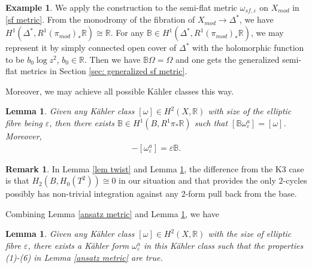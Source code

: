 \documentclass[11pt]{amsart}
\theoremstyle{plain}
\newtheorem{lem}[thm]{Lemma}
\theoremstyle{definition}
\newtheorem{ex}[thm]{Example}
\newtheorem{rk}[thm]{Remark}
\numberwithin{equation}{section}
\renewcommand{\epsilon}{\varepsilon}
\begin{document}
\begin{ex}
	We apply the construction to the semi-flat metric $\omega_{sf,\epsilon}$ on $X_{mod}$ in \eqref{sf metric}. From the monodromy of the fibration of $X_{mod}\rightarrow \Delta^*$, we have $H^1(\Delta^*,R^1(\pi_{mod})_*\mathbb{R})\cong \mathbb{R}$. 
	For any $\mathbb{B}\in H^1(\Delta^*,R^1(\pi_{mod})_*\mathbb{R})$, we may represent it by simply connected open cover of $\Delta^*$ with the holomorphic function to be $b_0\log{z}^2$, $b_0\in \mathbb{R}$. Then we have $\mathbb{B}\Omega=\Omega$ and one gets the generalized semi-flat metrics in Section \ref{sec: generalized sf metric}. 
\end{ex}
 Moreover, we may achieve all possible K\"ahler classes this way. 
\begin{lem} \cite[p.45]{GW} \label{B-twist Kahler form}
	Given any K\"ahler class $[\omega]\in H^2(X,\mathbb{R})$ with size of the elliptic fibre being $\epsilon$, then there exists $\mathbb{B}\in H^1(B,R^1\pi_*\mathbb{R})$ such that $[\mathbb{B}\omega_{\epsilon}^a]=[\omega]$. Moreover, 
	  \begin{align*}
	  	  [\mathbb{B}\omega_{\epsilon}^a]-[\omega_{\epsilon}^a]=\epsilon \mathbb{B}.
	  \end{align*}
\end{lem}
\begin{rk}
	In Lemma \ref{lem twist} and Lemma \ref{B-twist Kahler form}, the difference from the K3 case is that $H_2(B,H_0(T^2))\cong 0$ in our situation and that provides the only $2$-cycles possibly has non-trivial integration against any $2$-form pull back from the base. 
\end{rk}
Combining Lemma \ref{ansatz metric} and Lemma \ref{B-twist Kahler form}, we have 
\begin{lem} \label{ansatz metric 2}
	Given any K\"ahler class $[\omega]\in H^2(X,\mathbb{R})$ with the size of elliptic fibre $\epsilon$, there exists a K\"ahler form $\omega_{\epsilon}^a$ in this K\"ahler class such that the properties (1)-(6) in Lemma \ref{ansatz metric} are true. 
\end{lem}
\end{document}
